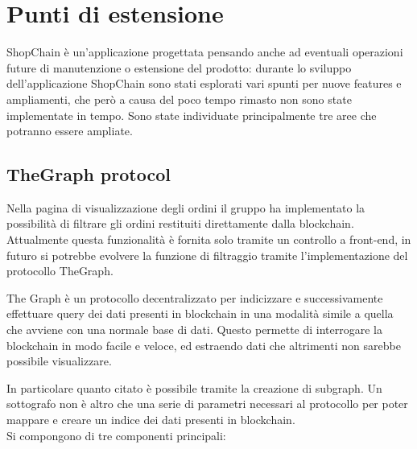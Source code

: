 \section{Punti di estensione} \label{section:punti_estensione}

ShopChain è un'applicazione progettata pensando anche ad eventuali operazioni future di manutenzione o
estensione del prodotto: durante lo sviluppo dell'applicazione ShopChain sono stati esplorati vari spunti per nuove features e ampliamenti, 
che però a causa del poco tempo rimasto non sono state implementate in tempo.
Sono state individuate principalmente tre aree che potranno essere ampliate.

\subsection{TheGraph protocol}

Nella pagina di visualizzazione degli ordini il gruppo ha implementato la possibilità di filtrare gli ordini restituiti direttamente dalla blockchain. Attualmente questa funzionalità è fornita solo tramite un controllo a front-end, in futuro si potrebbe evolvere la funzione di filtraggio tramite l'implementazione del protocollo TheGraph\glo{}.

The Graph è un protocollo decentralizzato per indicizzare e successivamente effettuare query dei dati presenti in blockchain in una modalità simile a quella che avviene con una normale base di dati. Questo permette di interrogare la blockchain in modo facile e veloce, ed estraendo dati che altrimenti non sarebbe possibile visualizzare.

In particolare quanto citato è possibile tramite la creazione di subgraph. Un sottografo non è altro che una serie di parametri necessari al protocollo per poter mappare e creare un indice dei dati presenti in blockchain.\\
Si compongono di tre componenti principali:

